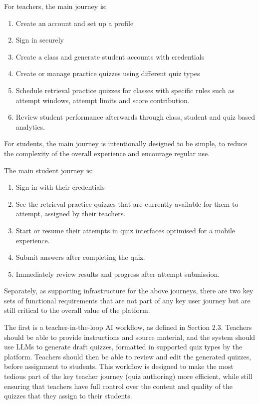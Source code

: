 \documentclass[
  12pt,
  a4paper,
]{report}
\providecommand{\tightlist}{%
  \setlength{\itemsep}{0pt}\setlength{\parskip}{0pt}}
\begin{document}
For teachers, the main journey is:

\begin{enumerate}
\def\labelenumi{\arabic{enumi}.}
\tightlist
\item
  Create an account and set up a profile
\item
  Sign in securely
\item
  Create a class and generate student accounts with credentials
\item
  Create or manage practice quizzes using different quiz types
\item
  Schedule retrieval practice quizzes for classes with specific rules such as
  attempt windows, attempt limits and score contribution.
\item
  Review student performance afterwards through class, student and quiz based analytics.
\end{enumerate}

For students, the main journey is intentionally designed to be simple, to reduce
the complexity of the overall experience and encourage regular use.

The main student journey is:

\begin{enumerate}
\def\labelenumi{\arabic{enumi}.}
\tightlist
\item
  Sign in with their credentials
\item
  See the retrieval practice quizzes that are currently available for them
  to attempt, assigned by their teachers.
\item
  Start or resume their attempts in quiz interfaces optimised for a mobile experience.
\item
  Submit answers after completing the quiz.
\item
  Immediately review results and progress after attempt submission.
\end{enumerate}

Separately, as supporting infrastructure for the above journeys, there are two
key sets of functional requirements that are not part of any key user journey
but are still critical to the overall value of the platform.

The first is a teacher-in-the-loop AI workflow, as defined in Section 2.3.
Teachers should be able to provide instructions and source material, and the
system should use LLMs to generate draft quizzes, formatted in supported quiz
types by the platform. Teachers should then be able to review and edit the generated
quizzes, before assignment to students. This workflow is designed to make the
most tedious part of the key teacher journey (quiz authoring) more efficient,
while still ensuring that teachers have full control over the content and quality
of the quizzes that they assign to their students.
\end{document}
